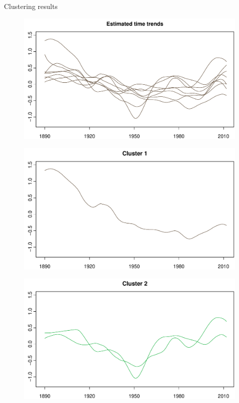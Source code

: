\documentclass[10pt, handout]{beamer}
\begin{document}
\begin{frame}{Clustering results}

{\begin{figure}
    		\centering
    		\includegraphics[width=1\textwidth]{plots//VOC/all_time_series}
  	\end{figure}}
	{\onslide<2>
	\vspace{-69.45mm}
	\begin{figure}
    		\centering
    		\includegraphics[width=1\textwidth]{plots//VOC/cluster_1}
  	\end{figure}}
	{\onslide<3>
	\vspace{-69.45mm}
	\begin{figure}
    		\centering
    		\includegraphics[width=1\textwidth]{plots//VOC/cluster_2}

\end{figure}}
\end{frame}
\end{document}
